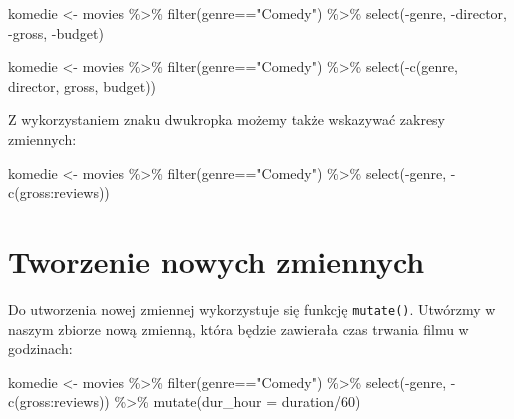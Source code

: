 \documentclass[
  letterpaper,
  DIV=11,
  numbers=noendperiod]{scrreprt}
\newenvironment{Shaded}{\begin{snugshade}}{\end{snugshade}}
\newcommand{\AttributeTok}[1]{\textcolor[rgb]{0.40,0.45,0.13}{#1}}
\newcommand{\DecValTok}[1]{\textcolor[rgb]{0.68,0.00,0.00}{#1}}
\newcommand{\FunctionTok}[1]{\textcolor[rgb]{0.28,0.35,0.67}{#1}}
\newcommand{\NormalTok}[1]{\textcolor[rgb]{0.00,0.23,0.31}{#1}}
\newcommand{\OtherTok}[1]{\textcolor[rgb]{0.00,0.23,0.31}{#1}}
\newcommand{\SpecialCharTok}[1]{\textcolor[rgb]{0.37,0.37,0.37}{#1}}
\newcommand{\StringTok}[1]{\textcolor[rgb]{0.13,0.47,0.30}{#1}}
\begin{document}
\begin{Shaded}
\begin{Highlighting}[]
\NormalTok{komedie }\OtherTok{\textless{}{-}}\NormalTok{ movies }\SpecialCharTok{\%\textgreater{}\%}
  \FunctionTok{filter}\NormalTok{(genre}\SpecialCharTok{==}\StringTok{"Comedy"}\NormalTok{) }\SpecialCharTok{\%\textgreater{}\%}
  \FunctionTok{select}\NormalTok{(}\SpecialCharTok{{-}}\NormalTok{genre, }\SpecialCharTok{{-}}\NormalTok{director, }\SpecialCharTok{{-}}\NormalTok{gross, }\SpecialCharTok{{-}}\NormalTok{budget)}


\NormalTok{komedie }\OtherTok{\textless{}{-}}\NormalTok{ movies }\SpecialCharTok{\%\textgreater{}\%}
  \FunctionTok{filter}\NormalTok{(genre}\SpecialCharTok{==}\StringTok{"Comedy"}\NormalTok{) }\SpecialCharTok{\%\textgreater{}\%}
  \FunctionTok{select}\NormalTok{(}\SpecialCharTok{{-}}\FunctionTok{c}\NormalTok{(genre, director, gross, budget))}
\end{Highlighting}
\end{Shaded}

Z wykorzystaniem znaku dwukropka możemy także wskazywać zakresy
zmiennych:

\begin{Shaded}
\begin{Highlighting}[]
\NormalTok{komedie }\OtherTok{\textless{}{-}}\NormalTok{ movies }\SpecialCharTok{\%\textgreater{}\%}
  \FunctionTok{filter}\NormalTok{(genre}\SpecialCharTok{==}\StringTok{"Comedy"}\NormalTok{) }\SpecialCharTok{\%\textgreater{}\%}
  \FunctionTok{select}\NormalTok{(}\SpecialCharTok{{-}}\NormalTok{genre, }\SpecialCharTok{{-}}\FunctionTok{c}\NormalTok{(gross}\SpecialCharTok{:}\NormalTok{reviews))}
\end{Highlighting}
\end{Shaded}

\hypertarget{tworzenie-nowych-zmiennych}{%
\section{Tworzenie nowych zmiennych}\label{tworzenie-nowych-zmiennych}}

Do utworzenia nowej zmiennej wykorzystuje się funkcję \texttt{mutate()}.
Utwórzmy w naszym zbiorze nową zmienną, która będzie zawierała czas
trwania filmu w godzinach:

\begin{Shaded}
\begin{Highlighting}[]
\NormalTok{komedie }\OtherTok{\textless{}{-}}\NormalTok{ movies }\SpecialCharTok{\%\textgreater{}\%}
  \FunctionTok{filter}\NormalTok{(genre}\SpecialCharTok{==}\StringTok{"Comedy"}\NormalTok{) }\SpecialCharTok{\%\textgreater{}\%}
  \FunctionTok{select}\NormalTok{(}\SpecialCharTok{{-}}\NormalTok{genre, }\SpecialCharTok{{-}}\FunctionTok{c}\NormalTok{(gross}\SpecialCharTok{:}\NormalTok{reviews)) }\SpecialCharTok{\%\textgreater{}\%}
  \FunctionTok{mutate}\NormalTok{(}\AttributeTok{dur\_hour =}\NormalTok{ duration}\SpecialCharTok{/}\DecValTok{60}\NormalTok{)}
\end{Highlighting}
\end{Shaded}
\end{document}
